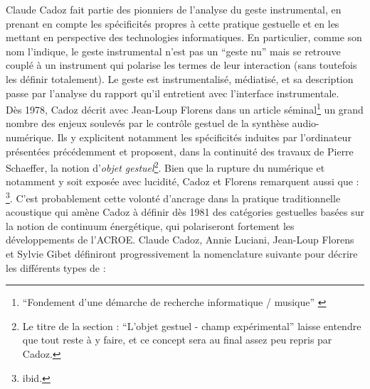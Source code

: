\noindent Claude Cadoz fait partie des pionniers de l'analyse du geste instrumental, en prenant en compte les spécificités propres à cette pratique gestuelle et en les mettant en perspective des technologies informatiques. En particulier, comme son nom l'indique, le geste instrumental n'est pas un ``geste nu'' mais se retrouve couplé à un instrument qui polarise les termes de leur interaction (sans toutefois les définir totalement). Le geste est instrumentalisé, médiatisé, et sa description passe par l'analyse du rapport qu'il entretient avec l'interface instrumentale.\\
\indent Dès 1978, Cadoz décrit avec Jean-Loup Florens dans un article séminal\footnote{``Fondement d’une démarche de recherche informatique / musique'' \cite{cadoz_fondement_1978}} un grand nombre des  enjeux soulevés par le contrôle gestuel de la synthèse audio-numérique. Ils y explicitent notamment les spécificités induites par l'ordinateur présentées précédemment et proposent, dans la continuité des travaux de Pierre Schaeffer, la notion d'\textit{objet gestuel}\footnote{Le titre de la section : ``L'objet gestuel - champ expérimental'' laisse entendre que tout reste à y faire, et ce concept sera au final assez peu repris par Cadoz.}. Bien que la rupture du numérique et notamment  y soit exposée avec lucidité, Cadoz et Florens remarquent aussi que : \footnote{ibid.}. C'est probablement cette volonté d'ancrage dans la pratique traditionnelle acoustique qui amène Cadoz à définir dès 1981 \cite{cadoz_synthese_1981} des catégories gestuelles basées sur la notion de continuum énergétique, qui polariseront fortement les développements de l'\gls{ACROE}. Claude Cadoz, Annie Luciani, Jean-Loup Florens et Sylvie Gibet définiront progressivement la nomenclature suivante pour décrire les différents types de  :
\vspace{-1em}

